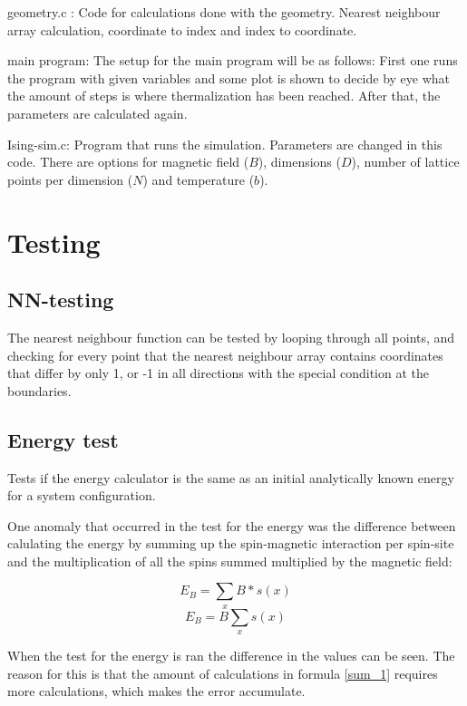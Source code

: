 \documentclass[11pt,a4paper]{article}
\begin{document}
geometry.c : Code for calculations done with the geometry. Nearest neighbour array calculation, coordinate to index and index to coordinate.

main program: The setup for the main program will be as follows: First one runs the program with given variables and some plot is shown to decide by eye what the amount of steps is where thermalization has been reached. After that, the parameters are calculated again.

Ising-sim.c: Program that runs the simulation. Parameters are changed in this code. There are options for magnetic field ($B$), dimensions ($D$), number of lattice points per dimension ($N$) and temperature ($b$).

\section{Testing}

\subsection{NN-testing}

The nearest neighbour function can be tested by looping through all points, and checking for every point that the nearest neighbour array contains coordinates that differ by only 1, or -1 in all directions with the special condition at the boundaries.

\subsection{Energy test}

Tests if the energy calculator is the same as an initial analytically known energy for a system configuration.

One anomaly that occurred in the test for the energy was the difference between calulating the energy by summing up the spin-magnetic interaction per spin-site and the multiplication of all the spins summed multiplied by the magnetic field:

\begin{equation}
E_{B} = \sum_{x} B  * s(x) 
\end{equation}
\label{sum_1}
\begin{equation}
E_{B} = B \sum_{x} s(x) 
\label{sum_2}
\end{equation}

When the test for the energy is ran the difference in the values can be seen. The reason for this is that the amount of calculations in formula \ref{sum_1} requires more calculations, which makes the error accumulate.
\end{document}
